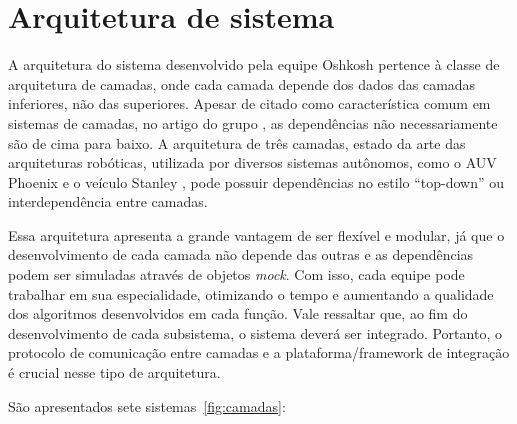 \section{Arquitetura de sistema}

A arquitetura do sistema desenvolvido pela equipe Oshkosh pertence à classe de
arquitetura de camadas, onde cada camada depende dos dados das camadas
inferiores, não das superiores. Apesar de citado como característica comum
em sistemas de camadas, no artigo do grupo \citep{chen2009terramax}, as
dependências não necessariamente são de cima para baixo. A arquitetura de três
camadas, estado da arte das arquiteturas robóticas, utilizada por diversos
sistemas autônomos, como o AUV Phoenix \citep{gat1991reliable} e o veículo
Stanley \citep{montemerlo2006winning}, pode possuir dependências no estilo
``top-down'' ou interdependência entre camadas.

Essa arquitetura apresenta a grande vantagem de ser flexível e
modular, já que o desenvolvimento de cada camada não depende das outras e as
dependências podem ser simuladas através de objetos \textit{mock}. Com isso,
cada equipe pode trabalhar em sua especialidade, otimizando o tempo e
aumentando a qualidade dos algoritmos desenvolvidos em cada função. Vale
ressaltar que, ao fim do desenvolvimento de cada subsistema, o sistema deverá
ser integrado. Portanto, o protocolo de comunicação entre camadas e a
plataforma/framework de integração é crucial nesse tipo de arquitetura.

São apresentados sete sistemas~\ref{fig:camadas}:

